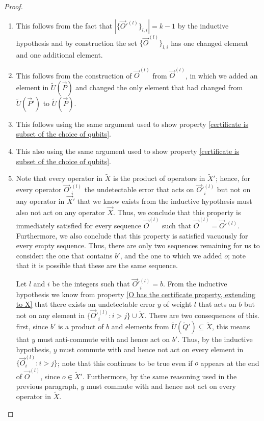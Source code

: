 \documentclass[twocolumn,showpacs,preprintnumbers,amsmath,amssymb,nofootinbib,pra,floatfix]{revtex4-1}
\newcommand{\lst}{\vec}
\newcommand{\set}{\tilde}
\begin{document}
\begin{proof}
\begin{description}
\begin{enumerate}
\item This follows from the fact that $\left|\{\lst O'^{(l)}\}_{l,i}\right| = k-1$ by the inductive hypothesis and by construction the set $\{\lst O^{(l)}\}_{l,i}$ has one changed element and one additional element.

\item This follows from the construction of $\lst O^{(l)}$ from $\lst O^{(l)}$, in which we added an element in $\set U(\lst P)$ and changed the only element that had changed from $\set U(\lst P')$ to $\set U(\lst P)$.

\item This follows using the same argument used to show property \ref{certificate is subset of the choice of qubits}.

\item This also using the same argument used to show property \ref{certificate is subset of the choice of qubits}.

\item
Note that every operator in $\set X$ is the product of operators in $\set X'$;  hence, for every operator $\lst O'^{(l)}_i$ the undetectable error that acts on $\lst O'^{(l)}_i$ but not on any operator in $\lst X'$ that we know exists from the inductive hypothesis must also not act on any operator $\lst X$.  Thus, we conclude that this property is immediately satisfied for every sequence $\lst O^{(l)}$ such that $\lst O^{(l)}=\lst O'^{(l)}$.  Furthermore, we also conclude that this property is satisfied vacuously for every empty sequence.  Thus, there are only two sequences remaining for us to consider:  the one that contains $b'$, and the one to which we added $o$;  note that it is possible that these are the same sequence.

Let $l$ and $i$ be the integers such that $\lst O'^{(l)}_i=b$.  From the inductive hypothesis we know from property \ref{O has the certificate property, extending to X} that there exists an undetectable error $y$ of weight $l$ that acts on $b$ but not on any element in $\{\lst O'^{(l)}_i : i > j\} \cup \set X$.  There are two consequences of this.  first, since $b'$ is a product of $b$ and elements from $\set U(\set Q')\subseteq\set X$, this means that $y$ must anti-commute with and hence act on $b'$.  Thus, by the inductive hypothesis, $y$ must commute with and hence not act on every element in $\{\lst O^{(l)}_i : i > j\}$;  note that this continues to be true even if $o$ appears at the end of $\lst O^{(l)}$, since $o\in\set X'$.  Furthermore, by the same reasoning used in the previous paragraph, $y$ must commute with and hence not act on every operator in $\set X$.


\end{enumerate}
\end{description}
\end{proof}
\end{document}
